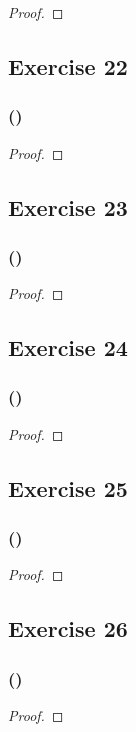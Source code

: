 \documentclass[14pt]{extarticle}
\begin{document}
\begin{proof}

\end{proof}

\subsection{Exercise 22}

\subsubsection{()}

\begin{proof}

\end{proof}

\subsection{Exercise 23}

\subsubsection{()}

\begin{proof}

\end{proof}

\subsection{Exercise 24}

\subsubsection{()}

\begin{proof}

\end{proof}

\subsection{Exercise 25}

\subsubsection{()}

\begin{proof}

\end{proof}

\subsection{Exercise 26}

\subsubsection{()}

\begin{proof}

\end{proof}
\end{document}
